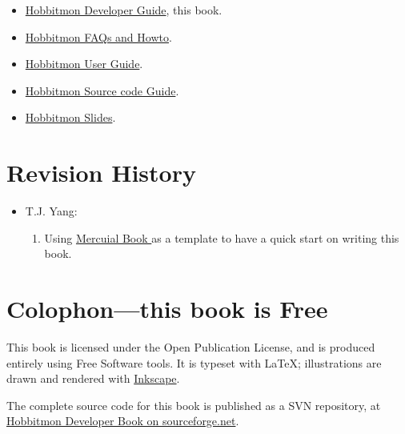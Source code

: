 \begin{itemize}
\item
  \href{http://hobbitmon.svn.sourceforge.net/viewvc/hobbitmon/branches/tjyang/src/books/hobbitmon-developer/en/}{Hobbitmon
    Developer Guide}, this book.
\item
  \href{http://hobbitmon.svn.sourceforge.net/viewvc/hobbitmon/branches/tjyang/src/books/hobbitmon-faq-howto/en/}{Hobbitmon
    FAQs and Howto}.
\item
  \href{http://hobbitmon.svn.sourceforge.net/viewvc/hobbitmon/branches/tjyang/src/books/hobbitmon-user-guide/en/}{Hobbitmon
    User Guide}.
\item
  \href{http://hobbitmon.svn.sourceforge.net/viewvc/hobbitmon/branches/tjyang/src/books/hobbitmon-sourcecode-guide/en/}{Hobbitmon
Source code Guide}.
\item
  \href{http://hobbitmon.svn.sourceforge.net/viewvc/hobbitmon/branches/tjyang/src/hobbitmon-slides/en/}{Hobbitmon
    Slides}.

\end{itemize}

\section{Revision History}

\begin{itemize}
\item T.J. Yang:
 \begin{enumerate}
  \item Using \href{http://hg.serpentine.com/mercurial/book/}{Mercuial Book } as a template to have a quick start on
    writing this book.
 \end{enumerate}

\end{itemize}

\section{Colophon---this book is Free}

This book is licensed under the Open Publication License, and is
produced entirely using Free Software tools.  It is typeset with
\LaTeX{}; illustrations are drawn and rendered with
\href{http://www.inkscape.org/}{Inkscape}.

The complete source code for this book is published as a SVN
repository, at
\href{http://hobbitmon.svn.sourceforge.net/viewvc/hobbitmon/branches/tjyang/src/books/hobbitmon-developer/en/}{Hobbitmon
  Developer Book on sourceforge.net}.


